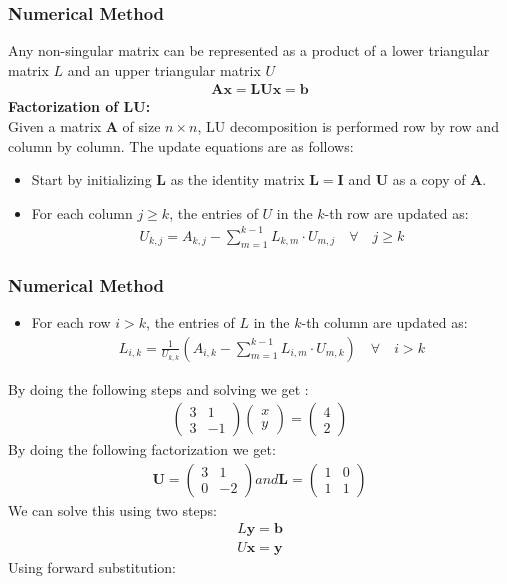 \documentclass{beamer}
\providecommand{\brak}[1]{\ensuremath{\left(#1\right)}}
\theoremstyle{remark}
\newcommand{\myvec}[1]{\ensuremath{\begin{pmatrix}#1\end{pmatrix}}}
\let\vec\mathbf
\numberwithin{equation}{section}
\begin{document}
\begin{frame}
\frametitle{Numerical Method}
Any non-singular matrix can be represented as a product of a lower triangular matrix $L$ and an upper triangular matrix $U$
\begin{align}
	\vec{A}\vec{x} = \vec{L}\vec{U}\vec{x} = \vec{b}
\end{align}
\textbf{Factorization of LU:}\\
Given a matrix $ \mathbf{A} $ of size $ n \times n $, LU decomposition is performed row by row and column by column. The update equations are as follows: 
\begin{itemize}
    \item Start by initializing $ \mathbf{L} $ as the identity matrix $ \mathbf{L} = \mathbf{I} $ and $ \mathbf{U} $ as a copy of $ \mathbf{A} $.\\
    \item For each column $ j \geq k $, the entries of $ U $ in the $ k $-th row are updated as:
    \begin{align}
        U_{k,j} = A_{k,j} - \sum_{m=1}^{k-1} L_{k,m} \cdot U_{m,j}\quad \forall \quad j \geq k
    \end{align}
    \end{itemize}
\end{frame}
\begin{frame}
\frametitle{Numerical Method}
\begin{itemize}
\item For each row $ i > k $, the entries of $ L $ in the $ k $-th column are updated as:
    \begin{align}
        L_{i,k} = \frac{1}{U_{k,k}} \brak{ A_{i,k} - \sum_{m=1}^{k-1} L_{i,m} \cdot U_{m,k}} \quad \forall \quad i > k
    \end{align}
    \end{itemize}
    By doing the following steps and solving we get :
\begin{align}
    \myvec{3 & 1 \\ 3& -1}\myvec{x\\y} = \myvec{4\\2}
\end{align}
By doing the following factorization we get:
\begin{align}
	\vec{U}=\myvec{3 & 1\\0 & -2} and  \vec{ L} = \myvec{1 & 0\\ 1 & 1}
\end{align}
We can solve this using two steps:
\begin{align}
    L\vec{y} = \vec{b}\\
    U\vec{x} = \vec{y}
\end{align}
Using forward substitution:
\end{frame}
\end{document}
